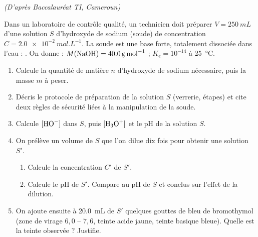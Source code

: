 \documentclass[11pt]{article}
\begin{document}
\begin{exercice}
\textit{(D'après Baccalauréat TI, Cameroun)}

Dans un laboratoire de contrôle qualité, un technicien doit préparer $V = \SI{250}{mL}$ d'une solution $S$ d'hydroxyde de sodium (soude) de concentration $C = \SI{2,0e-2}{mol.L^{-1}}$. La soude est une base forte, totalement dissociée dans l'eau : . On donne : $M(\ce{NaOH}) = \SI{40,0}{g.mol^{-1}}$ ; $K_e = 10^{-14}$ à \SI{25}{\celsius}.
\begin{enumerate}
\item Calcule la quantité de matière $n$ d'hydroxyde de sodium nécessaire, puis la masse $m$ à peser.
\item Décris le protocole de préparation de la solution $S$ (verrerie, étapes) et cite deux règles de sécurité liées à la manipulation de la soude.
\item Calcule $[\ce{HO-}]$ dans $S$, puis $[\ce{H3O+}]$ et le pH de la solution $S$.
\item On prélève un volume de $S$ que l'on dilue dix fois pour obtenir une solution $S'$.
\begin{enumerate}
\item Calcule la concentration $C'$ de $S'$.
\item Calcule le pH de $S'$. Compare au pH de $S$ et conclus sur l'effet de la dilution.
\end{enumerate}
\item On ajoute ensuite à \SI{20,0}{mL} de $S'$ quelques gouttes de bleu de bromothymol (zone de virage $6{,}0$ -- $7{,}6$, teinte acide jaune, teinte basique bleue). Quelle est la teinte observée ? Justifie.
\end{enumerate}
\end{exercice}
\end{document}

